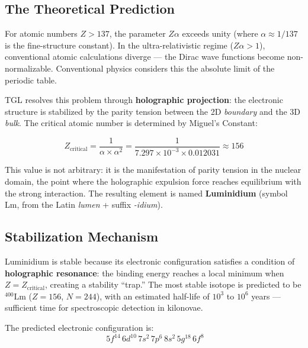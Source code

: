 \documentclass[12pt,a4paper,twoside]{article}
\newcommand{\alphaii}{\alpha^{2}}
\newcommand{\boundary}{\textit{boundary}}
\newcommand{\bulk}{\textit{bulk}}
\begin{document}
\subsection{The Theoretical Prediction}

For atomic numbers $Z > 137$, the parameter $Z\alpha$ exceeds unity (where $\alpha \approx 1/137$ is the fine-structure constant). In the ultra-relativistic regime ($Z\alpha > 1$), conventional atomic calculations diverge --- the Dirac wave functions become non-normalizable. Conventional physics considers this the absolute limit of the periodic table.

TGL resolves this problem through \textbf{holographic projection}: the electronic structure is stabilized by the parity tension between the 2D \boundary{} and the 3D \bulk. The critical atomic number is determined by Miguel's Constant:

\begin{equationbox}[title={Critical Atomic Number}]
\begin{equation}
\boxed{Z_{\text{critical}} = \frac{1}{\alpha \times \alphaii} = \frac{1}{7.297 \times 10^{-3} \times 0.012031} \approx 156}
\label{eq:z_critical}
\end{equation}
\end{equationbox}

\noindent This value is not arbitrary: it is the manifestation of parity tension in the nuclear domain, the point where the holographic expulsion force reaches equilibrium with the strong interaction. The resulting element is named \textbf{Luminidium} (symbol Lm, from the Latin \textit{lumen} + suffix \textit{-idium}).



\subsection{Stabilization Mechanism}

Luminidium is stable because its electronic configuration satisfies a condition of \textbf{holographic resonance}: the binding energy reaches a local minimum when $Z = Z_{\text{critical}}$, creating a stability ``trap.'' The most stable isotope is predicted to be ${}^{400}\text{Lm}$ ($Z = 156$, $N = 244$), with an estimated half-life of $10^3$ to $10^6$ years --- sufficient time for spectroscopic detection in kilonovae.

The predicted electronic configuration is:
\begin{equation}
[\text{Og}]\; 5f^{14}\, 6d^{10}\, 7s^2\, 7p^6\, 8s^2\, 5g^{18}\, 6f^8
\label{eq:lm_config}
\end{equation}
\end{document}
